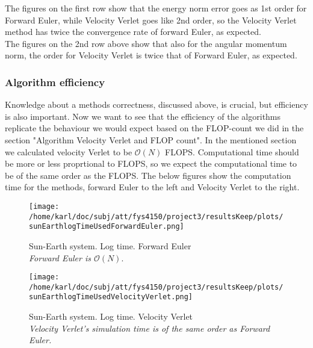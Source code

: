 \documentclass{article}
\begin{document}
The figures on the first row show that the energy norm error goes as 1st order for Forward Euler, while Velocity Verlet goes like 2nd order, so the Velocity Verlet method has twice the convergence rate of forward Euler, as expected.\\

The figures on the 2nd row above show that also for the angular momentum norm, the order for Velocity Verlet is twice that of Forward Euler, as expected.

\subsubsection{Algorithm efficiency}
Knowledge about a methods correctness, discussed above, is crucial, but efficiency is also important. Now we want to see that the efficiency of the algorithms replicate the behaviour we would expect based on the FLOP-count we did in the section "Algorithm Velocity Verlet and FLOP count". In the mentioned section we calculated velocity Verlet to be $\mathcal{O}(N)$ FLOPS. Computational time should be more or less proprtional to FLOPS, so we expect the computational time to be of the same order as the FLOPS. The below figures show the computation time for the methods, forward Euler to the left and Velocity Verlet to the right.

\begin{minipage}{.45\textwidth} 
	\begin{figure}[H]
		\centering
		\texttt{[image: /home/karl/doc/subj/att/fys4150/project3/resultsKeep/plots/sunEarthlogTimeUsedForwardEuler.png]}
		\caption{Sun-Earth system. Log time. Forward Euler \\ \textit{Forward Euler is $\mathcal{O}(N)$}.}
		\label{1}
	\end{figure}
\end{minipage}\hfill
\begin{minipage}{.45\textwidth} 
	\begin{figure}[H]
		\centering
		\texttt{[image: /home/karl/doc/subj/att/fys4150/project3/resultsKeep/plots/sunEarthlogTimeUsedVelocityVerlet.png]}
		\caption{Sun-Earth system. Log time. Velocity Verlet \\ \textit{Velocity Verlet's simulation time is of the same order as Forward Euler.}}
		\label{1}
	\end{figure}
\end{minipage}\hfill
\vspace{2ex}
\end{document}
